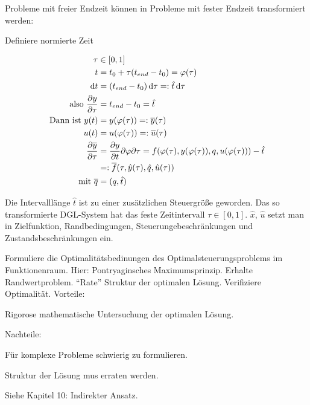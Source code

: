 
Probleme mit freier Endzeit können in Probleme mit fester Endzeit transformiert werden:

Definiere normierte Zeit 

\begin{align*}
\tau &\in [0,1] \\
t &= t_0 + \tau ({t_{end}}-t_0) = \varphi(\tau) \\
\,\mathrm d t &= ({t_{end}} -t_0) \,\mathrm d \tau =: \hat t \,\mathrm d \tau \\
\text{also } \frac{\partial y}{\partial \tau} &= {t_{end}} - t_0 = \hat t \\
\text{Dann ist } y(t) &= y(\varphi(\tau)) =: \overline y(\tau)  \\
u(t) &= u(\varphi(\tau)) =: \overline u(\tau) \\
\frac{\partial \overline y}{\partial \tau} &= \frac{\partial y}{\partial t}{\partial \varphi}{\partial \tau} = f(\varphi(\tau), y(\varphi(\tau)), q, u(\varphi(\tau)))- \hat t \\
&=: \overline f(\tau, \hat y(\tau), \hat q, \hat u(\tau)) \\
\text{mit } \overline q &= (q, \hat t) \\
\end{align*}

Die Intervalllänge $\hat t$ ist zu einer zusätzlichen Steuergröße geworden. Das so transformierte DGL-System hat das feste Zeitintervall $\tau \in [0,1]$. $\hat x$, $\hat u$ setzt man in Zielfunktion, Randbedingungen, Steuerungebeschränkungen und Zustandsbeschränkungen ein.



Formuliere die Optimalitätsbedinungen des Optimalsteuerungsproblems im Funktionenraum. Hier: Pontryaginsches Maximumsprinzip. Erhalte Randwertproblem. "`Rate"' Struktur der optimalen Lösung. Verifiziere Optimalität. Vorteile:

\bitm
\item Rigorose mathematische Untersuchung der optimalen Lösung.
\eitm

Nachteile:

\bitm
\item Für komplexe Probleme schwierig zu formulieren.
\item Struktur der Lösung mus erraten werden.
\eitm

Siehe Kapitel 10: Indirekter Ansatz.


